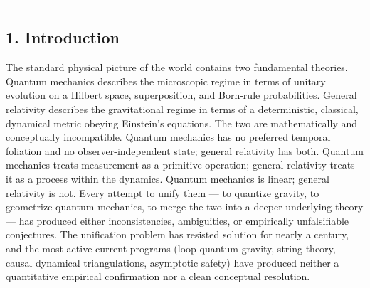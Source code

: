 \documentclass[
]{article}
\begin{document}
\begin{center}\rule{0.5\linewidth}{0.5pt}\end{center}

\hypertarget{introduction}{%
\subsection{1. Introduction}\label{introduction}}

The standard physical picture of the world contains two fundamental
theories. Quantum mechanics describes the microscopic regime in terms of
unitary evolution on a Hilbert space, superposition, and Born-rule
probabilities. General relativity describes the gravitational regime in
terms of a deterministic, classical, dynamical metric obeying Einstein's
equations. The two are mathematically and conceptually incompatible.
Quantum mechanics has no preferred temporal foliation and no
observer-independent state; general relativity has both. Quantum
mechanics treats measurement as a primitive operation; general
relativity treats it as a process within the dynamics. Quantum mechanics
is linear; general relativity is not. Every attempt to unify them --- to
quantize gravity, to geometrize quantum mechanics, to merge the two into
a deeper underlying theory --- has produced either inconsistencies,
ambiguities, or empirically unfalsifiable conjectures. The unification
problem has resisted solution for nearly a century, and the most active
current programs (loop quantum gravity, string theory, causal dynamical
triangulations, asymptotic safety) have produced neither a quantitative
empirical confirmation nor a clean conceptual resolution.
\end{document}
